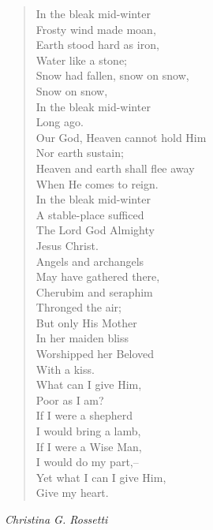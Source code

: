 
\begin{verse}
In the bleak mid-winter\\
\hspace*{2em}Frosty wind made moan,\\
Earth stood hard as iron,\\
\hspace*{2em}Water like a stone;\\
Snow had fallen, snow on snow,\\
\hspace*{2em}Snow on snow,\\
In the bleak mid-winter\\
\hspace*{2em}Long ago.\\[0.7em]

Our God, Heaven cannot hold Him\\
\hspace*{2em}Nor earth sustain;\\
Heaven and earth shall flee away\\
\hspace*{2em}When He comes to reign.\\
In the bleak mid-winter\\
\hspace*{2em}A stable-place sufficed\\
The Lord God Almighty\\
\hspace*{2em}Jesus Christ.\\[0.7em]

Angels and archangels\\
\hspace*{2em}May have gathered there,\\
Cherubim and seraphim\\
\hspace*{2em}Thronged the air;\\
But only His Mother\\
\hspace*{2em}In her maiden bliss\\
Worshipped her Beloved\\
\hspace*{2em}With a kiss.\\[0.7em]

What can I give Him,\\
\hspace*{2em}Poor as I am?\\
If I were a shepherd\\
\hspace*{2em}I would bring a lamb,\\
If I were a Wise Man,\\
\hspace*{2em}I would do my part,--\\
Yet what I can I give Him,\\
\hspace*{2em}Give my heart.%
\end{verse}

\vspace{0.5\baselineskip}
\noindent\textit{Christina G. Rossetti}

\newpage

